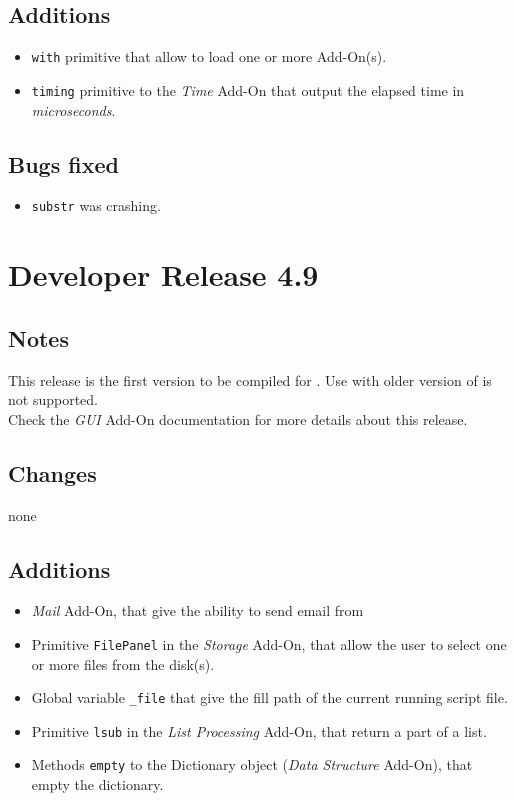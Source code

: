 \subsection{Additions}

\begin{itemize}
\item {\tt with} primitive that allow to load one or more Add-On(s).
\item {\tt timing} primitive to the {\it Time} Add-On that output the elapsed time in {\it microseconds}.
\end{itemize}

\subsection{Bugs fixed}

\begin{itemize}
\item {\tt substr} was crashing.
\end{itemize}

\section{Developer Release 4.9}

\subsection{Notes}

This release is the first version to be compiled for . Use with older version of \beos is not supported.\\

Check the {\it GUI} Add-On documentation for more details about this release.

\subsection{Changes} 

none

\subsection{Additions}

\begin{itemize}
\item {\it Mail} Add-On, that give the ability to send email from \squirrel
\item Primitive {\tt FilePanel} in the {\it Storage} Add-On, that allow the user to select one or more files from the disk(s).
\item Global variable {\tt \verb+_+file} that give the fill path of the current running script file.
\item Primitive {\tt lsub} in the {\it List Processing} Add-On, that return a part of a list.
\item Methods {\tt empty} to the Dictionary object ({\it Data Structure} Add-On), that empty the dictionary.
\end{itemize}

